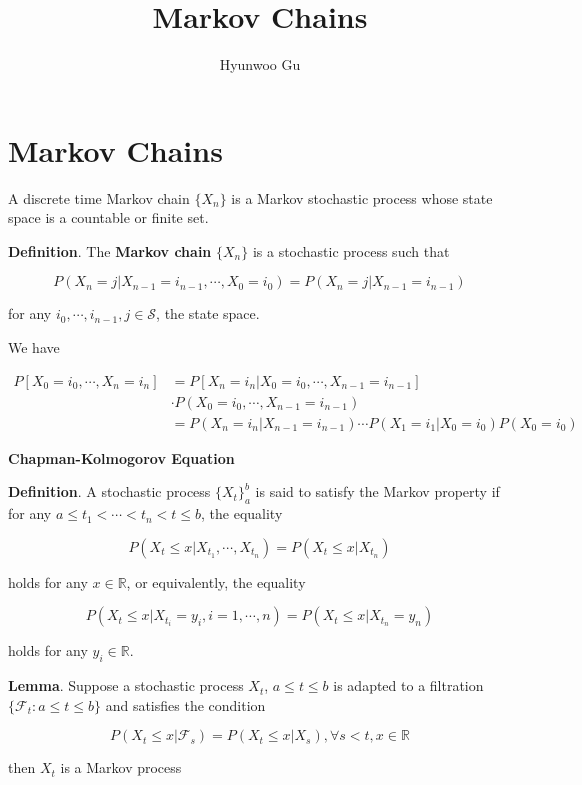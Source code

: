\documentclass[12pt]{article}
\theoremstyle{nonumberbreak}
\begin{document}
\title{\textbf{Markov Chains}}
\author{Hyunwoo Gu}
\date{}

\maketitle


\section{Markov Chains}

A discrete time Markov chain $\{ X_n \}$ is a Markov stochastic process whose state space is a countable or finite set. 

\bigskip

\begin{theorem}
\textbf{Definition}. The \textbf{Markov chain} $\{X_n\}$ is a stochastic process such that

$$
P(X_n = j | X_{n-1} = i_{n-1}, \cdots, X_0 = i_0) = P(X_n = j | X_{n-1} = i_{n-1})
$$

for any $i_0, \cdots, i_{n-1}, j \in \mathcal{S}$, the state space. 
\end{theorem}


We have

$$
\begin{aligned}
P\left[ X_0 = i_0, \cdots, X_n = i_n \right] &= P[X_n = i_n | X_0 = i_0, \cdots, X_{n-1} = i_{n-1}] \\[8pt]
&\cdot P(X_0 = i_0, \cdots, X_{n-1} = i_{n-1}) \\[8pt]
&= P(X_n = i_n | X_{n-1} = i_{n-1}) \cdots P(X_1 = i_1 | X_0 = i_0) P(X_0 = i_0)
\end{aligned}
$$


\pagebreak
\textbf{Chapman-Kolmogorov Equation}


\begin{theorem}
\textbf{Definition}. A stochastic process $\{X_t \}_a^b$ is said to satisfy the Markov property if for any $a \le t_1 < \cdots < t_n < t \le b$, the equality 

$$
P(X_t \le x | X_{t_1}, \cdots, X_{t_n} ) = P(X_t \le x | X_{t_n})
$$

holds for any $x \in \mathbb{R}$, or equivalently, the equality

$$
P(X_t \le x | X_{t_i} = y_i, i=1,\cdots,n ) = P(X_t \le x | X_{t_n} = y_n)
$$

holds for any $y_i \in \mathbb{R}$. 

\textbf{Lemma}. Suppose a stochastic process $X_t$, $a \le t \le b$ is adapted to a filtration $\{\mathcal{F}_t : a \le t \le b \}$ and satisfies the condition

$$
P (X_t \le x | \mathcal{F}_s) = P(X_t \le x | X_s), \forall s < t, x\in \mathbb{R}
$$

then $X_t$ is a Markov process
\end{theorem}
\end{document}
